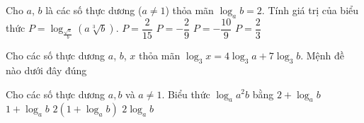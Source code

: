 \begin{ex}%
	Cho $a$, $b$ là các số thực dương ($ a\ne 1$) thỏa mãn $\log_a b=2$. Tính giá trị  của biểu thức
	$P=\log_{\frac{\sqrt{a}}{b}}\left(  a\sqrt[3]{b}\right)$.
	 \choice
		 {$P=\dfrac{2}{15}$}
		{$P=-\dfrac{2}{9}$} 
		{\True  $P=-\dfrac{10}{9}$}
		{$P=\dfrac{2}{3}$} 
\end{ex}

\begin{ex}%
	Cho các số thực  dương $a$, $b$, $x$ thỏa mãn $\log_3 x=4\log_3 a+7\log_3 b$. Mệnh đề nào dưới đây đúng
\end{ex}

\begin{ex}%
	Cho các số thực dương $ a,b$ và $ a\ne 1$. Biểu thức $\log_a{a^2}b$  bằng
	 \choice
		 {\True $ 2+\log_ab$}
		{$ 1+\log_ab$} 
		{$ 2\left(1+\log_ab\right)$} 
		{$ 2\log_ab$} 
\end{ex}

